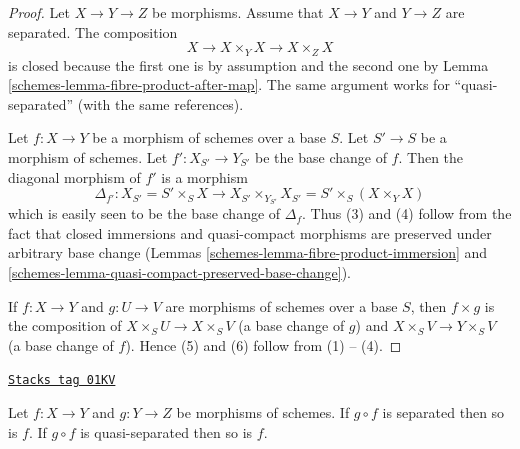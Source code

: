 \begin{proof}

Let $X \to Y \to Z$ be morphisms. Assume that $X \to Y$ and
$Y \to Z$ are separated. The composition
$$
X \to X \times_Y X \to X \times_Z X
$$
is closed because the first one is by assumption and the second
one by Lemma \ref{schemes-lemma-fibre-product-after-map}. The same argument
works for ``quasi-separated'' (with the same references).

\medskip\noindent
Let $f : X \to Y$ be a morphism of schemes over a base $S$.
Let $S' \to S$ be a morphism of schemes. Let $f' : X_{S'} \to Y_{S'}$
be the base change of $f$. Then the diagonal morphism
of $f'$ is a morphism
$$
\Delta_{f'} :
X_{S'} = S' \times_S X
\longrightarrow
X_{S'} \times_{Y_{S'}} X_{S'} = S' \times _S (X \times_Y X)
$$
which is easily seen to be the base change of $\Delta_f$.
Thus (3) and (4) follow from the fact that
closed immersions and quasi-compact morphisms are preserved
under arbitrary base change (Lemmas
\ref{schemes-lemma-fibre-product-immersion} and
\ref{schemes-lemma-quasi-compact-preserved-base-change}).

\medskip\noindent
If $f : X \to Y$ and $g : U \to V$ are morphisms of schemes over a base $S$,
then $f \times g$ is the composition of $X \times_S U \to X \times_S V$
(a base change of $g$) and $X \times_S V \to Y \times_S V$ (a base change
of $f$). Hence (5) and (6) follow from (1) -- (4).
\end{proof}

\begin{lemma}
\label{schemes-lemma-compose-after-separated}
\href{https://stacks.math.columbia.edu/tag/01KV}{\texttt{Stacks tag 01KV}}


Let $f : X \to Y$ and $g : Y \to Z$ be morphisms of schemes.
If $g \circ f$ is separated then so is $f$.
If $g \circ f$ is quasi-separated then so is $f$.
\end{lemma}

